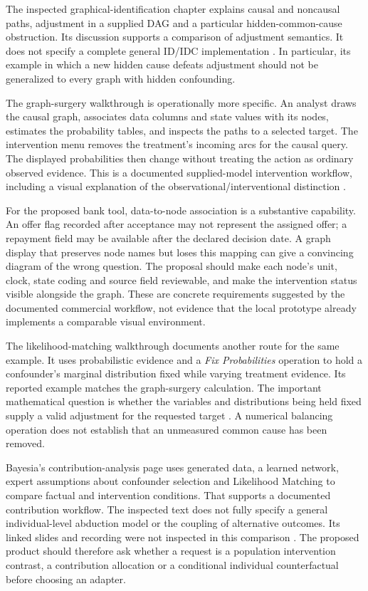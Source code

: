 The inspected graphical-identification chapter explains causal and noncausal
paths, adjustment in a supplied DAG and a particular hidden-common-cause
obstruction. Its discussion supports a comparison of adjustment semantics.
It does not specify a complete general ID/IDC implementation
\citep{exec13_ci_bayesia_criteria}. In particular, its example in which a new
hidden cause defeats adjustment should not be generalized to every graph with
hidden confounding.

The graph-surgery walkthrough is operationally more specific. An analyst draws
the causal graph, associates data columns and state values with its nodes,
estimates the probability tables, and inspects the paths to a selected target.
The intervention menu removes the treatment's incoming arcs for the causal
query. The displayed probabilities then change without treating the action as
ordinary observed evidence. This is a documented supplied-model intervention
workflow, including a visual explanation of the observational/interventional
distinction \citep{exec13_ci_bayesia_surgery}.

For the proposed bank tool, data-to-node association is a substantive capability.
An offer flag recorded after acceptance may not represent the assigned offer;
a repayment field may be available after the declared decision date. A graph
display that preserves node names but loses this mapping can give a convincing
diagram of the wrong question. The proposal should make each node's unit,
clock, state coding and source field reviewable, and make the intervention
status visible alongside the graph. These are concrete requirements suggested
by the documented commercial workflow, not evidence that the local prototype
already implements a comparable visual environment.

The likelihood-matching walkthrough documents another route for the same
example. It uses probabilistic evidence and a \emph{Fix Probabilities} operation
to hold a confounder's marginal distribution fixed while varying treatment
evidence. Its reported example matches the graph-surgery calculation. The
important mathematical question is whether the variables and distributions
being held fixed supply a valid adjustment for the requested target
\citep{exec13_ci_bayesia_matching}. A numerical balancing operation does not
establish that an unmeasured common cause has been removed.

Bayesia's contribution-analysis page uses generated data, a learned network,
expert assumptions about confounder selection and Likelihood Matching to compare
factual and intervention conditions. That supports a documented contribution
workflow. The inspected text does not fully specify a general individual-level
abduction model or the coupling of alternative outcomes. Its linked slides
and recording were not inspected in this comparison
\citep{exec13_ci_bayesia_counterfactual}. The proposed product should therefore
ask whether a request is a population intervention contrast, a contribution
allocation or a conditional individual counterfactual before choosing an adapter.

